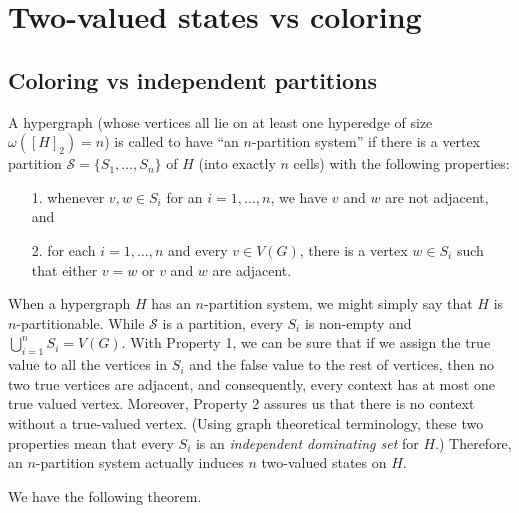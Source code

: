 \documentclass[%
12pt,
prereprint,
showpacs,
showkeys,
preprintnumbers,
amsmath,amssymb,
aps,
pra,
longbibliography,
notitlepage
]{revtex4-1}
\theoremstyle{definition}
\begin{document}
        \section{Two-valued states vs coloring}\label{color-conj}

        \subsection{Coloring vs independent partitions}
        A hypergraph (whose vertices all lie on at least one hyperedge of size $\omega([H]_2 )=n$) is called to have ``an $n$-partition system'' if there is a vertex partition $\mathcal{S}=\{S_1 , \ldots , S_n \}$ of $H$ (into exactly $n$ cells) with the following properties:
        \begin{itemize}
                \item[1.] whenever $v,w \in S_i$ for an $i=1,\ldots , n$, we have $v$ and $w$ are not adjacent, and
                \item[2.] for each $i=1,\ldots , n$ and every $v \in V(G)$, there is a vertex $w \in S_i$ such that either $v =w$ or $v$ and $w$ are adjacent.
        \end{itemize}

        When a hypergraph $H$ has an $n$-partition system, we might simply say that $H$ is $n$-partitionable. While $\mathcal{S}$ is a partition, every $S_i$ is non-empty and $\bigcup_{i=1}^{n} S_i = V(G)$. With Property 1, we can be sure that if we assign the true value to all the vertices in $S_i$ and the false value to the rest of vertices, then no two true vertices are adjacent, and consequently, every context has at most one true valued vertex. Moreover, Property 2 assures us that there is no context without a true-valued vertex. (Using graph theoretical terminology, these two properties mean that every $S_i$ is an \emph{independent dominating set} for $H$.)  Therefore, an $n$-partition system actually induces $n$ two-valued states on $H$.%

        We have the following theorem.
\end{document}
